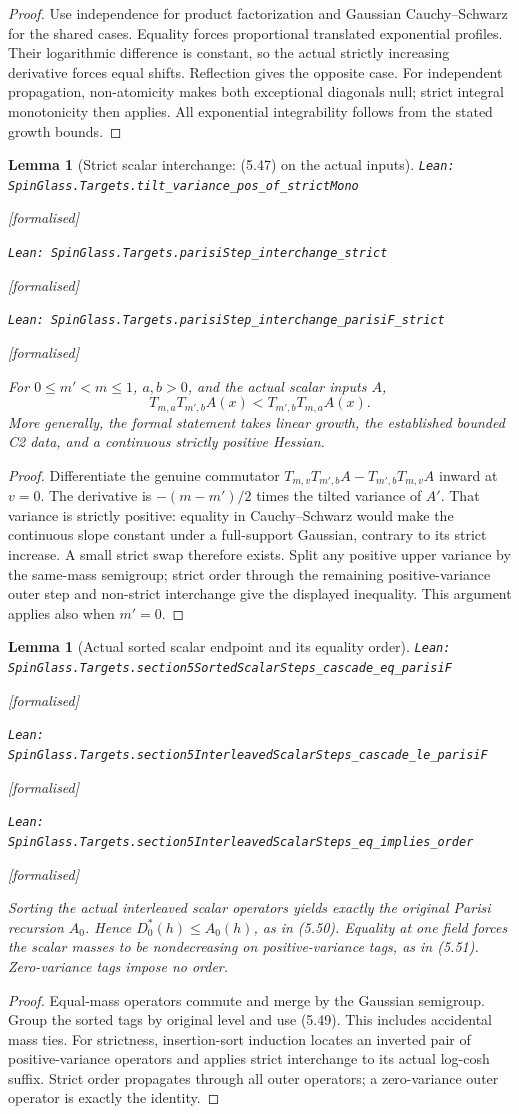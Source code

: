 \documentclass[11pt]{article}
\providecommand{\lean}[1]{\leavevmode\par\nopagebreak
  {\noindent\normalfont\footnotesize\raggedright\texttt{Lean: #1}\par}\nopagebreak}
\providecommand{\leanok}{\par\nopagebreak
  {\noindent\normalfont\footnotesize\textcolor{green!50!black}{[formalised]}\par}\nopagebreak}
\newtheorem{lemma}[theorem]{Lemma}
\begin{document}
\begin{proof}
Use independence for product factorization and Gaussian Cauchy--Schwarz for
the shared cases. Equality forces proportional translated exponential
profiles. Their logarithmic difference is constant, so the actual strictly
increasing derivative forces equal shifts. Reflection gives the opposite
case. For independent propagation, non-atomicity makes both exceptional
diagonals null; strict integral monotonicity then applies. All exponential
integrability follows from the stated growth bounds.
\end{proof}
\begin{lemma}[Strict scalar interchange: (5.47) on the actual inputs]
\lean{SpinGlass.Targets.tilt\_variance\_pos\_of\_strictMono}\leanok
\lean{SpinGlass.Targets.parisiStep\_interchange\_strict}\leanok
\lean{SpinGlass.Targets.parisiStep\_interchange\_parisiF\_strict}\leanok
For $0\le m'<m\le1$, $a,b>0$, and the actual scalar inputs $A$,
\[
 T_{m,a}T_{m',b}A(x)<T_{m',b}T_{m,a}A(x).
\]
More generally, the formal statement takes linear growth, the established
bounded C2 data, and a continuous strictly positive Hessian.
\end{lemma}
\begin{proof}
Differentiate the genuine commutator
$T_{m,v}T_{m',b}A-T_{m',b}T_{m,v}A$ inward at $v=0$.
The derivative is $-(m-m')/2$ times the tilted variance of $A'$.
That variance is strictly positive: equality in Cauchy--Schwarz would make
the continuous slope constant under a full-support Gaussian, contrary to
its strict increase. A small strict swap therefore exists. Split any
positive upper variance by the same-mass semigroup; strict order through
the remaining positive-variance outer step and non-strict interchange
give the displayed inequality. This argument applies also when $m'=0$.
\end{proof}

\begin{lemma}[Actual sorted scalar endpoint and its equality order]
\lean{SpinGlass.Targets.section5SortedScalarSteps\_cascade\_eq\_parisiF}\leanok
\lean{SpinGlass.Targets.section5InterleavedScalarSteps\_cascade\_le\_parisiF}\leanok
\lean{SpinGlass.Targets.section5InterleavedScalarSteps\_eq\_implies\_order}\leanok
Sorting the actual interleaved scalar operators yields exactly the original
Parisi recursion $A_0$. Hence $D_0^*(h)\le A_0(h)$, as in (5.50).
Equality at one field forces the scalar masses to be nondecreasing on
positive-variance tags, as in (5.51). Zero-variance tags impose no order.
\end{lemma}
\begin{proof}
Equal-mass operators commute and merge by the Gaussian semigroup. Group
the sorted tags by original level and use (5.49). This includes accidental
mass ties. For strictness, insertion-sort induction locates an inverted
pair of positive-variance operators and applies strict interchange to its
actual log-cosh suffix. Strict order propagates through all outer operators;
a zero-variance outer operator is exactly the identity.
\end{proof}
\end{document}
